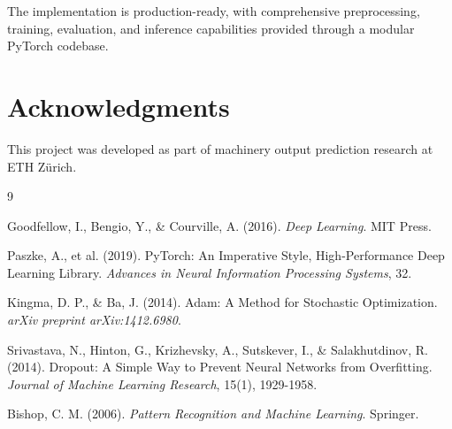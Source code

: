 \documentclass[12pt,a4paper]{article}
\begin{document}
The implementation is production-ready, with comprehensive preprocessing, training, evaluation, and inference capabilities provided through a modular PyTorch codebase.

\section*{Acknowledgments}

This project was developed as part of machinery output prediction research at ETH Zürich.

\begin{thebibliography}{9}

Goodfellow, I., Bengio, Y., \& Courville, A. (2016).
\textit{Deep Learning}.
MIT Press.

Paszke, A., et al. (2019).
PyTorch: An Imperative Style, High-Performance Deep Learning Library.
\textit{Advances in Neural Information Processing Systems}, 32.

Kingma, D. P., \& Ba, J. (2014).
Adam: A Method for Stochastic Optimization.
\textit{arXiv preprint arXiv:1412.6980}.

Srivastava, N., Hinton, G., Krizhevsky, A., Sutskever, I., \& Salakhutdinov, R. (2014).
Dropout: A Simple Way to Prevent Neural Networks from Overfitting.
\textit{Journal of Machine Learning Research}, 15(1), 1929-1958.

Bishop, C. M. (2006).
\textit{Pattern Recognition and Machine Learning}.
Springer.

\end{thebibliography}
\end{document}
